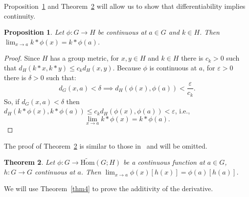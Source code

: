 \documentclass{article}
\newtheorem{theorem}{Theorem}[section]
\newtheorem{proposition}[theorem]{Proposition}
\numberwithin{theorem}{section}
\numberwithin{equation}{section}
\begin{document}
Proposition~\ref{prop5} and Theorem~\ref{thm3} will allow us to show that differentiability implies continuity.

\begin{proposition}\label{prop5}
Let $\phi : G \to H$ be continuous at $a \in G$ and $k \in H$. Then $\lim_{x\to a} k \ast \phi(x) = k \ast \phi(a)$.
\end{proposition}
\begin{proof}
Since $H$ has a group metric, for $x, y \in H$ and $k \in H$ there is $c_k > 0$ such that $d_H(k \ast x, k \ast y) \leq c_k d_H(x, y)$. Because $\phi$ is continuous at $a$, for $\varepsilon > 0$ there is $\delta > 0$ such that:
\[
d_G(x, a) < \delta \implies d_H(\phi(x), \phi(a)) < \frac{\varepsilon}{c_k}.
\]
So, if $d_G(x, a) < \delta$ then $d_H(k \ast \phi(x), k \ast \phi(a)) \leq c_k d_H(\phi(x), \phi(a)) < \varepsilon$, i.e.,
\[
\lim_{x\to a} k \ast \phi(x) = k \ast \phi(a).
\]
\end{proof}

The proof of Theorem~\ref{thm3} is similar to those in~\cite{arora2021} and will be omitted.

\begin{theorem}\label{thm3}
Let $\phi : G \to \tilde{\mathrm{Hom}}(G; H)$ be a continuous function at $a \in G$, $h : G \to G$ continuous at $a$. Then $\lim_{x\to a} \phi(x)[h(x)] = \phi(a)[h(a)]$.
\end{theorem}

We will use Theorem~\ref{thm4} to prove the additivity of the derivative.
\end{document}
